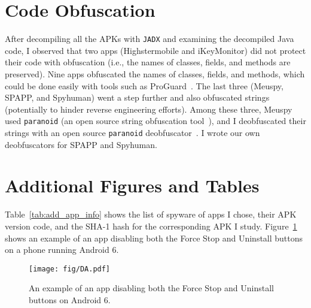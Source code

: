 \section{Code Obfuscation}
\label{sec:apk_obfuscation}

After decompiling all the APKs with \texttt{JADX} and examining the
decompiled Java code, I observed that two apps (Highstermobile and
iKeyMonitor) did not protect their code with obfuscation
(i.e., the names of classes, fields, and methods are preserved). Nine
apps obfuscated the names of classes, fields, and methods, which could
be done easily with tools such as ProGuard~\cite{LeaderIn1:online}.
The last three (Meuspy, SPAPP, and Spyhuman)
went a step further and also obfuscated strings (potentially to hinder
reverse engineering efforts). Among these three, Meuspy used
\texttt{paranoid} (an open source string obfuscation
tool~\cite{MichaelR90:online}), and I deobfuscated their strings with
an open source \texttt{paranoid}
deobfuscator~\cite{giacomof39:online}. I wrote our own deobfuscators
for SPAPP and Spyhuman.


\section{Additional Figures and Tables}
\label{sec:additional_figures}

Table~\ref{tab:add_app_info} shows the list of spyware of apps I chose, their APK version code, and the SHA-1 hash for the corresponding APK I study.
Figure~\ref{fig:da} shows an example of an app disabling both the Force Stop and Uninstall buttons on a phone running Android 6.

\vspace*{2in}
\hspace*{1in}

\begin{figure}[t]
\centering
\texttt{[image: fig/DA.pdf]}
\caption{An example of an app disabling both the
Force Stop and Uninstall buttons on Android 6.}
\label{fig:da}
\end{figure}
